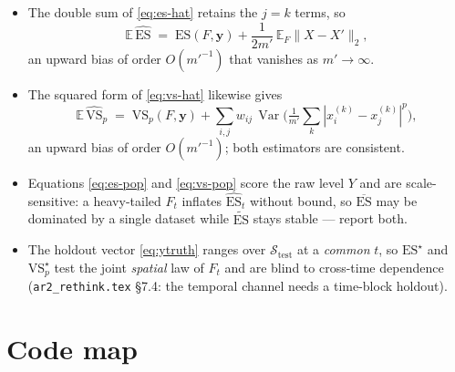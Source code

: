 \documentclass[11pt]{article}
\newcommand{\E}{\mathbb{E}}
\newcommand{\Var}{\operatorname{Var}}
\begin{document}
\begin{itemize}[leftmargin=1.5em, itemsep=3pt]
  \item The double sum of \eqref{eq:es-hat} retains the $j=k$ terms, so
        \begin{equation}
          \E\,\widehat{\mathrm{ES}}
            \;=\; \mathrm{ES}(F,\bm y)
                 + \frac{1}{2m'}\,\E_F\|X-X'\|_2 ,
        \end{equation}
        an upward bias of order $O(m'^{-1})$ that vanishes as
        $m'\to\infty$.
  \item The squared form of \eqref{eq:vs-hat} likewise gives
        \begin{equation}
          \E\,\widehat{\mathrm{VS}}_p
            \;=\; \mathrm{VS}_p(F,\bm y)
                 + \sum_{i,j} w_{ij}\,
                   \Var\!\Big(\tfrac1{m'}\textstyle\sum_k
                   |x_i^{(k)}-x_j^{(k)}|^p\Big),
        \end{equation}
        an upward bias of order $O(m'^{-1})$; both estimators are
        consistent.
  \item Equations \eqref{eq:es-pop} and \eqref{eq:vs-pop} score the raw
        level $Y$ and are scale-sensitive: a heavy-tailed $F_t$ inflates
        $\widehat{\mathrm{ES}}_t$ without bound, so $\overline{\mathrm{ES}}$
        may be dominated by a single dataset while
        $\widetilde{\mathrm{ES}}$ stays stable --- report both.
  \item The holdout vector \eqref{eq:ytruth} ranges over
        $\mathcal S_{\mathrm{test}}$ at a \emph{common} $t$, so
        $\mathrm{ES}^\star$ and $\mathrm{VS}_p^\star$ test the joint
        \emph{spatial} law of $F_t$ and are blind to cross-time
        dependence (\texttt{ar2\_rethink.tex} \S7.4: the temporal channel
        needs a time-block holdout).
\end{itemize}

\section*{Code map}
\end{document}
